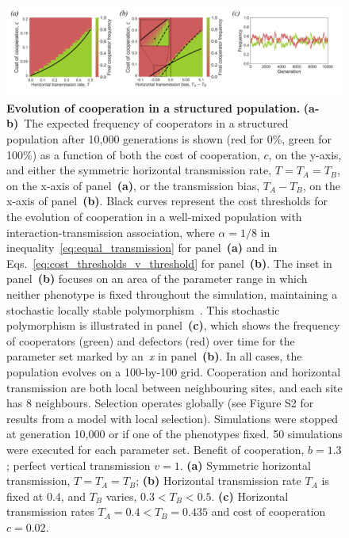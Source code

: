 \documentclass[12pt]{extarticle}
\begin{document}
\begin{figure}[h]
  \centering
  \includegraphics[width=1\textwidth]{../PRSB_figures/fig_4.pdf}
  \caption{
  \textbf{Evolution of cooperation in a structured population.}
	\textbf{(a-b)}~The expected frequency of cooperators in a structured population after 10,000 generations is shown (red for 0\%, green for 100\%) as a function of both the cost of cooperation, $c$, on the y-axis, and either the symmetric horizontal transmission rate, $T=T_A=T_B$, on the x-axis of panel~\textbf{(a)}, or the transmission bias, $T_A-T_B$, on the x-axis of panel~\textbf{(b)}.
  Black curves represent the cost thresholds for the evolution of cooperation in a well-mixed population with interaction-transmission association, where $\alpha=1/8$ in inequality~\ref{eq:equal_transmission} for  panel~\textbf{(a)} and in Eqs.~\ref{eq:cost_thresholds_v_threshold} for panel~\textbf{(b)}.
	The inset in panel~\textbf{(b)} focuses on an area of the parameter range in which neither phenotype is fixed throughout the simulation, maintaining a stochastic locally stable polymorphism~\citep{Karlin1975}.
	This stochastic polymorphism is illustrated in panel~\textbf{(c)}, which shows the frequency of cooperators (green) and defectors (red) over time for the parameter set marked by an~\textit{x} in panel~\textbf{(b)}.
  In all cases, the population evolves on a 100-by-100 grid.
  Cooperation and horizontal transmission are both local between neighbouring sites, and each site has 8 neighbours.
  Selection operates globally (see Figure S2 for results from a model with local selection).
  Simulations were stopped at generation 10,000 or if one of the phenotypes fixed. 50 simulations were executed for each parameter set.
  Benefit of cooperation, $b=1.3$; perfect vertical transmission $v=1$.
  \textbf{(a)} Symmetric horizontal transmission, $T=T_A=T_B$;
  \textbf{(b)} Horizontal transmission rate $T_A$ is fixed at $0.4$, and $T_B$ varies, $0.3<T_B<0.5$.
  \textbf{(c)} Horizontal transmission rates $T_A = 0.4 < T_B = 0.435$ and cost of cooperation $c=0.02$.
  }
  \label{fig:spatial}
\end{figure}
\end{document}

